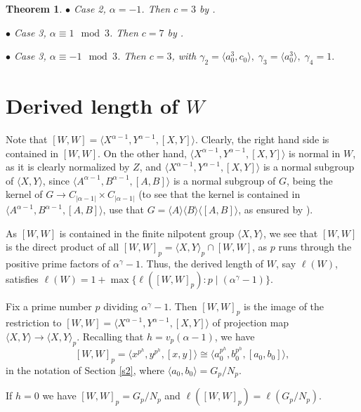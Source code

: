 \documentclass{amsart}
\newtheorem{theorem}{Theorem}[section]
\theoremstyle{definition}
\theoremstyle{remark}
\begin{document}
{\begin{theorem}
$\bullet$ Case 2, $\alpha=-1$. Then $c=3$ by \cite[Proposition 8.2]{MS}.

$\bullet$ Case 3, $\alpha\equiv 1\mod 3$. Then $c=7$ by \cite[Theorem 8.1]{MS}.

$\bullet$ Case 3, $\alpha\equiv -1\mod 3$. Then $c=3$, with
$\gamma_{2}=\langle a_0^{3}, c_0\rangle,\; 
\gamma_{3}=\langle a_0^{3}\rangle,\;\gamma_{4}=1.
$
\end{theorem}

\section{Derived length of $W$}

Note that $[W,W]=\langle X^{\alpha-1}, Y^{\alpha-1}, [X,Y]\rangle$. Clearly, the right hand side is contained in $[W,W]$.
On the other hand, $\langle X^{\alpha-1}, Y^{\alpha-1}, [X,Y]\rangle$ is normal in $W$, as it is clearly normalized by $Z$,
and $\langle X^{\alpha-1}, Y^{\alpha-1}, [X,Y]\rangle$ is a normal subgroup of $\langle X,Y\rangle$, since
$\langle A^{\alpha-1}, B^{\alpha-1}, [A,B]\rangle$ is a normal subgroup of $G$, being the kernel of 
$G\to C_{|\alpha-1|}\times C_{|\alpha-1|}$ (to see that the kernel is contained in $\langle A^{\alpha-1}, B^{\alpha-1}, [A,B]\rangle$,
use that $G=\langle A\rangle \langle B\rangle \langle [A,B]\rangle$, as ensured by 
\cite[Lemma 6.1]{MS}). %

As $[W,W]$ is contained in the finite nilpotent group $\langle X,Y\rangle$, we see that 
$[W,W]$ is the direct product of all $[W,W]_p=\langle X,Y\rangle_p\cap [W,W]$,
as $p$ runs through the positive prime factors of $\alpha^\gamma-1$. Thus, the derived
length of $W$, say $\ell(W)$, satisfies $\ell(W)=1+\max\{\ell([W,W]_p):p\mid (\alpha^\gamma-1)\}$.

Fix a prime number $p$ dividing $\alpha^\gamma-1$.
Then $[W,W]_p$ is the image of the restriction to $[W,W]=\langle X^{\alpha-1}, Y^{\alpha-1}, [X,Y]\rangle$ 
of projection map $\langle X,Y\rangle\to \langle X,Y\rangle_p$.
Recalling that $h=v_p(\alpha-1)$, we have
$$
[W,W]_p=\langle x^{p^h}, y^{p^h}, [x,y]\rangle\cong \langle a_0^{p^h}, b_0^{p^h}, [a_0,b_0]\rangle,
$$
in the notation of Section \ref{s2}, where $\langle a_0,b_0\rangle=G_p/N_p$. 

If $h=0$ we have $[W,W]_p=G_p/N_p$ and $\ell([W,W]_p)=\ell(G_p/N_p)$.

}
\end{document}
